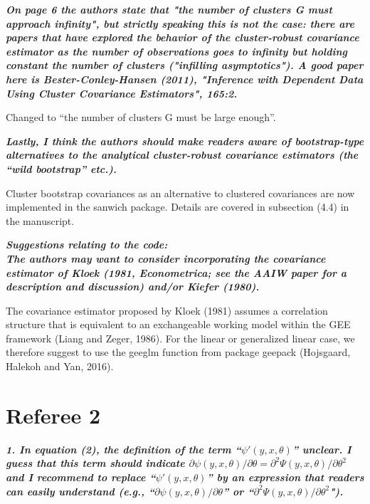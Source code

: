 \documentclass[10pt,a4paper]{article}
\begin{document}
\medskip

\textbf{\textit{
On page 6 the authors state that "the number of clusters G must approach infinity", but strictly speaking this is not the case: there are papers that have explored the behavior of the cluster-robust covariance estimator as the number of observations goes to infinity but holding constant the number of clusters ("infilling asymptotics").  A good paper here is Bester-Conley-Hansen (2011), "Inference with Dependent Data Using Cluster Covariance Estimators", 165:2.
}}

\medskip

Changed to ``the number of clusters G must be large enough''.

\medskip

\textbf{\textit{Lastly, I think the authors should make readers aware of bootstrap-type alternatives to the analytical cluster-robust covariance estimators (the ``wild bootstrap'' etc.).}}

\medskip

Cluster bootstrap covariances as an alternative to clustered covariances are now implemented in the sanwich package. Details are covered in subsection (4.4) in the manuscript.

\medskip

\textbf{\textit{Suggestions relating to the code:
\\
The authors may want to consider incorporating the  covariance estimator of Kloek (1981, Econometrica; see the AAIW paper for a description and discussion) and/or Kiefer (1980).}}

\medskip

The covariance estimator proposed by Kloek (1981) assumes a correlation structure that is equivalent to an exchangeable working model within the GEE framework (Liang and Zeger, 1986).
For the linear or generalized linear case, we therefore suggest to use the geeglm function from package geepack (Hojsgaard, Halekoh and Yan, 2016).

\section*{Referee 2}

\textbf{\textit{1. In equation (2), the definition of the term ``$\psi'(y, x, \theta)$'' unclear.
I guess that this term should indicate $\partial \psi(y, x, \theta)/\partial\theta = \partial^2\Psi(y, x, \theta)/\partial\theta^2$ and I recommend to replace ``$\psi'(y, x, \theta)$''
by an expression that readers can easily understand
(e.g., ``$\partial \psi(y, x, \theta)/\partial\theta$'' or ``$\partial^2\Psi(y, x, \theta)/\partial\theta^2$").}}
\end{document}
